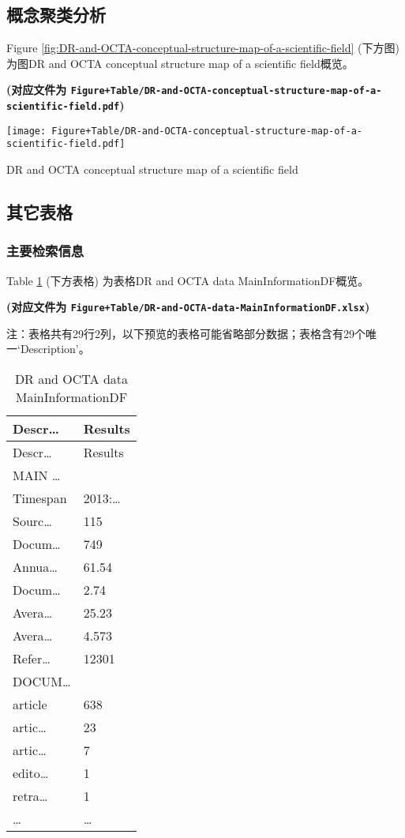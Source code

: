 \documentclass[
]{article}
\begin{document}
\hypertarget{ux6982ux5ff5ux805aux7c7bux5206ux6790}{%
\subsection{概念聚类分析}\label{ux6982ux5ff5ux805aux7c7bux5206ux6790}}

Figure \ref{fig:DR-and-OCTA-conceptual-structure-map-of-a-scientific-field} (下方图) 为图DR and OCTA conceptual structure map of a scientific field概览。

\textbf{(对应文件为 \texttt{Figure+Table/DR-and-OCTA-conceptual-structure-map-of-a-scientific-field.pdf})}

\def\@captype{figure}
\begin{center}
\texttt{[image: Figure+Table/DR-and-OCTA-conceptual-structure-map-of-a-scientific-field.pdf]}
\caption{DR and OCTA conceptual structure map of a scientific field}\label{fig:DR-and-OCTA-conceptual-structure-map-of-a-scientific-field}
\end{center}

\hypertarget{extra}{%
\subsection{其它表格}\label{extra}}

\hypertarget{ux4e3bux8981ux68c0ux7d22ux4fe1ux606f}{%
\subsubsection{主要检索信息}\label{ux4e3bux8981ux68c0ux7d22ux4fe1ux606f}}

Table \ref{tab:DR-and-OCTA-data-MainInformationDF} (下方表格) 为表格DR and OCTA data MainInformationDF概览。

\textbf{(对应文件为 \texttt{Figure+Table/DR-and-OCTA-data-MainInformationDF.xlsx})}

\begin{center}\begin{tcolorbox}[colback=gray!10, colframe=gray!50, width=0.9\linewidth, arc=1mm, boxrule=0.5pt]注：表格共有29行2列，以下预览的表格可能省略部分数据；表格含有29个唯一`Description'。
\end{tcolorbox}
\end{center}

\begin{longtable}[]{@{}ll@{}}
\caption{\label{tab:DR-and-OCTA-data-MainInformationDF}DR and OCTA data MainInformationDF}\tabularnewline
\toprule
Descr\ldots{} & Results\tabularnewline
\midrule
\endfirsthead
\toprule
Descr\ldots{} & Results\tabularnewline
\midrule
\endhead
MAIN \ldots{} &\tabularnewline
Timespan & 2013:\ldots{}\tabularnewline
Sourc\ldots{} & 115\tabularnewline
Docum\ldots{} & 749\tabularnewline
Annua\ldots{} & 61.54\tabularnewline
Docum\ldots{} & 2.74\tabularnewline
Avera\ldots{} & 25.23\tabularnewline
Avera\ldots{} & 4.573\tabularnewline
Refer\ldots{} & 12301\tabularnewline
DOCUM\ldots{} &\tabularnewline
article & 638\tabularnewline
artic\ldots{} & 23\tabularnewline
artic\ldots{} & 7\tabularnewline
edito\ldots{} & 1\tabularnewline
retra\ldots{} & 1\tabularnewline
\ldots{} & \ldots{}\tabularnewline
\bottomrule
\end{longtable}
\end{document}
